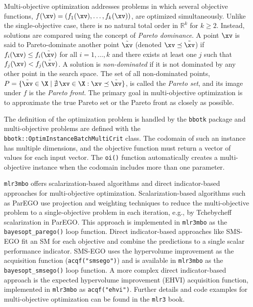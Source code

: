 \documentclass[12pt,letterpaper]{article}
\begin{document}
\label{sec:multi-objective-optimization}

Multi-objective optimization addresses problems in which several objective functions, $f(\xv) = (f_1(\xv), \dots, f_k(\xv))$, are optimized simultaneously\cite{ehrgott2005}.
Unlike the single-objective case, there is no natural total order in $\mathbb{R}^k$ for $k \geq 2$.
Instead, solutions are compared using the concept of \emph{Pareto dominance}.
A point $\xv$ is said to Pareto-dominate another point $\tilde \xv$ (denoted $\xv \preceq \tilde \xv$) if $f_i(\xv) \leq f_i(\tilde \xv)$ for all $i = 1, \ldots, k$ and there exists at least one $j$ such that $f_j(\xv) < f_j(\tilde \xv)$.
A solution is \emph{non-dominated} if it is not dominated by any other point in the search space.
The set of all non-dominated points, $P = \{\tilde \xv \in \X \mid \nexists\, \xv \in \X : \xv \preceq \tilde \xv\}$, is called the \emph{Pareto set}, and its image under $f$ is the \emph{Pareto front}.
The primary goal in multi-objective optimization is to approximate the true Pareto set or the Pareto front as closely as possible.

The definition of the optimization problem is handled by the \texttt{bbotk} package and
multi-objective problems are defined with the \texttt{bbotk::OptimInstanceBatchMultiCrit} class.
The codomain of such an instance has multiple dimensions, and the objective function must return a vector of values for each input vector.
The \texttt{oi()} function automatically creates a multi-objective instance when the codomain includes more than one parameter.

\texttt{mlr3mbo} offers scalarization-based algorithms and direct indicator-based approaches for multi-objective optimization\cite{horn2015,karl2023}.
Scalarization-based algorithms such as ParEGO\cite{knowles2006} use projection and weighting techniques to reduce the multi-objective problem to a single-objective problem in each iteration, e.g.,
by Tchebycheff scalarization in ParEGO.
This approach is implemented in \texttt{mlr3mbo} as the \texttt{bayesopt\_parego()} loop function.
Direct indicator-based approaches like SMS-EGO\cite{beume2007} fit an SM for each objective and combine the predictions to a single scalar performance indicator.
SMS-EGO uses the hypervolume improvement as the acquisition function (\texttt{acqf("smsego")}) and is available in \texttt{mlr3mbo} as the \texttt{bayesopt\_smsego()} loop function.
A more complex direct indicator-based approach is the expected hypervolume improvement (EHVI) acquisition function\cite{emmerich2016}, implemented in \texttt{mlr3mbo} as \texttt{acqf("ehvi")}.
Further details and code examples for multi-objective optimization can be found in the \texttt{mlr3} book\cite{schneider2024}.
\end{document}
